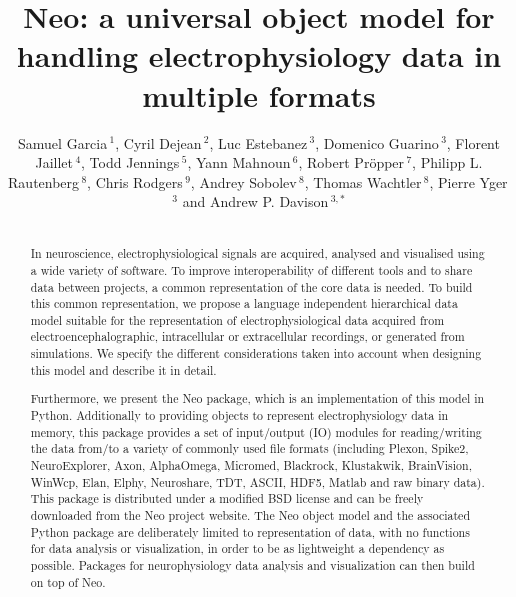 \documentclass{frontiers}
\def\firstAuthorLast{Garcia {et~al.}}
\def\Authors{Samuel Garcia\,$^{1}$, Cyril Dejean\,$^{2}$, Luc
Estebanez\,$^{3}$, Domenico Guarino\,$^{3}$, Florent Jaillet\,$^{4}$, Todd
Jennings\,$^{5}$, Yann Mahnoun\,$^{6}$, Robert Pröpper\,$^{7}$, Philipp L. Rautenberg\,$^{8}$, Chris Rodgers\,$^{9}$, Andrey Sobolev\,$^{8}$, Thomas Wachtler\,$^{8}$, Pierre Yger\,$^{3}$ and Andrew P. Davison\,$^{3,*}$}
\begin{document}
\onecolumn
{}

\title[An object model for electrophysiology]{Neo: a universal object model for handling electrophysiology data in multiple formats}
\author[\firstAuthorLast ]{\Authors}
\address{}
\correspondance{}
\editor{}

\maketitle
\begin{abstract}

\section{}

In neuroscience, electrophysiological signals are acquired, analysed and visualised using a wide variety of software.
To improve interoperability of different tools and to share data between projects, a common representation of the core data is needed.
To build this common representation, we propose a language independent hierarchical data model suitable for the representation of electrophysiological data acquired from electroencephalographic, intracellular or extracellular recordings, or generated from simulations.
We specify the different considerations taken into account when designing this model and describe it in detail.

Furthermore, we present the Neo package, which is an implementation of this model in Python.
Additionally to providing objects to represent electrophysiology data in memory, this package provides a set of input/output (IO) modules for reading/writing the data from/to a variety of commonly used file formats (including Plexon, Spike2, NeuroExplorer, Axon, AlphaOmega, Micromed, Blackrock, Klustakwik, BrainVision, WinWcp, Elan, Elphy, Neuroshare, TDT, ASCII, HDF5, Matlab and raw binary data).
This package is distributed under a modified BSD license and can be freely downloaded from the Neo project website.
The Neo object model and the associated Python package are deliberately limited to representation of data, with no functions for data analysis or visualization, in order to be as lightweight a dependency as possible.
Packages for neurophysiology data analysis and visualization can then build on top of Neo.


\end{abstract}
\end{document}
